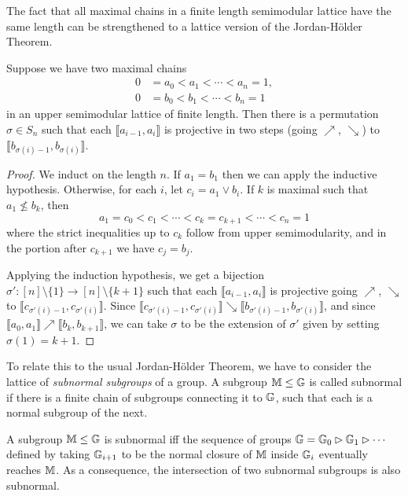 \begin{appendices}
The fact that all maximal chains in a finite length semimodular lattice have the same length can be strengthened to a lattice version of the Jordan-H\"older Theorem.

\begin{thm}\label{thm-jordan-holder} Suppose we have two maximal chains
\begin{align*}
0 &= a_0 < a_1 < \cdots < a_n = 1,\\
0 &= b_0 < b_1 < \cdots < b_n = 1
\end{align*}
in an upper semimodular lattice of finite length. Then there is a permutation $\sigma \in S_n$ such that each $\llbracket a_{i-1}, a_i\rrbracket$ is projective in two steps (going $\nearrow$, $\searrow$) to $\llbracket b_{\sigma(i)-1}, b_{\sigma(i)} \rrbracket$.
\end{thm}
\begin{proof} We induct on the length $n$. If $a_1 = b_1$ then we can apply the inductive hypothesis. Otherwise, for each $i$, let $c_i = a_1 \vee b_i$. If $k$ is maximal such that $a_1 \not\le b_k$, then
\[
a_1 = c_0 < c_1 < \cdots < c_k = c_{k+1} < \cdots < c_n = 1
\]
where the strict inequalities up to $c_k$ follow from upper semimodularity, and in the portion after $c_{k+1}$ we have $c_j = b_j$.

Applying the induction hypothesis, we get a bijection $\sigma' : [n]\setminus\{1\} \rightarrow [n]\setminus\{k+1\}$ such that each $\llbracket a_{i-1}, a_i\rrbracket$ is projective going $\nearrow$, $\searrow$ to $\llbracket c_{\sigma'(i)-1}, c_{\sigma'(i)} \rrbracket$. Since $\llbracket c_{\sigma'(i)-1}, c_{\sigma'(i)} \rrbracket \searrow \llbracket b_{\sigma'(i)-1}, b_{\sigma'(i)} \rrbracket$, and since $\llbracket a_0, a_1 \rrbracket \nearrow \llbracket b_k, b_{k+1}\rrbracket$, we can take $\sigma$ to be the extension of $\sigma'$ given by setting $\sigma(1) = k+1$.
\end{proof}

To relate this to the usual Jordan-H\"older Theorem, we have to consider the lattice of \emph{subnormal subgroups} of a group. A subgroup $\mathbb{M} \le \mathbb{G}$ is called subnormal if there is a finite chain of subgroups connecting it to $\mathbb{G}$, such that each is a normal subgroup of the next.

\begin{prop} A subgroup $\mathbb{M} \le \mathbb{G}$ is subnormal iff the sequence of groups $\mathbb{G} = \mathbb{G}_0 \rhd \mathbb{G}_1 \rhd \cdots$ defined by taking $\mathbb{G}_{i+1}$ to be the normal closure of $\mathbb{M}$ inside $\mathbb{G}_i$ eventually reaches $\mathbb{M}$. As a consequence, the intersection of two subnormal subgroups is also subnormal.
\end{prop}


\end{appendices}
